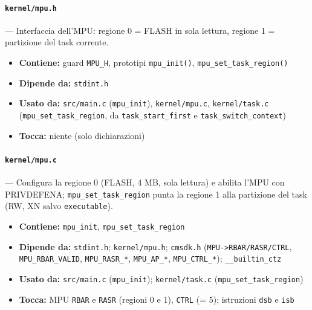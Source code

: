 \paragraph{\texttt{kernel/mpu.h}} --- Interfaccia dell'MPU: regione 0 = FLASH in sola lettura, regione 1 = partizione del task corrente.
\begin{itemize}
  \item \textbf{Contiene:} guard \texttt{MPU\_H}, prototipi \texttt{mpu\_init()}, \texttt{mpu\_set\_task\_region()}
  \item \textbf{Dipende da:} \texttt{stdint.h}
  \item \textbf{Usato da:} \texttt{src/main.c} (\texttt{mpu\_init}), \texttt{kernel/mpu.c}, \texttt{kernel/task.c} (\texttt{mpu\_set\_task\_region}, da \texttt{task\_start\_first} e \texttt{task\_switch\_context})
  \item \textbf{Tocca:} niente (solo dichiarazioni)
\end{itemize}

\paragraph{\texttt{kernel/mpu.c}} --- Configura la regione 0 (FLASH, 4 MB, sola lettura) e abilita l'MPU con PRIVDEFENA; \texttt{mpu\_set\_task\_region} punta la regione 1 alla partizione del task (RW, XN salvo \texttt{executable}).
\begin{itemize}
  \item \textbf{Contiene:} \texttt{mpu\_init}, \texttt{mpu\_set\_task\_region}
  \item \textbf{Dipende da:} \texttt{stdint.h}; \texttt{kernel/mpu.h}; \texttt{cmsdk.h} (\texttt{MPU->RBAR/RASR/CTRL}, \texttt{MPU\_RBAR\_VALID}, \texttt{MPU\_RASR\_*}, \texttt{MPU\_AP\_*}, \texttt{MPU\_CTRL\_*}); \texttt{\_\_builtin\_ctz}
  \item \textbf{Usato da:} \texttt{src/main.c} (\texttt{mpu\_init}); \texttt{kernel/task.c} (\texttt{mpu\_set\_task\_region})
  \item \textbf{Tocca:} MPU \texttt{RBAR} e \texttt{RASR} (regioni 0 e 1), \texttt{CTRL} (= 5); istruzioni \texttt{dsb} e \texttt{isb}
\end{itemize}

